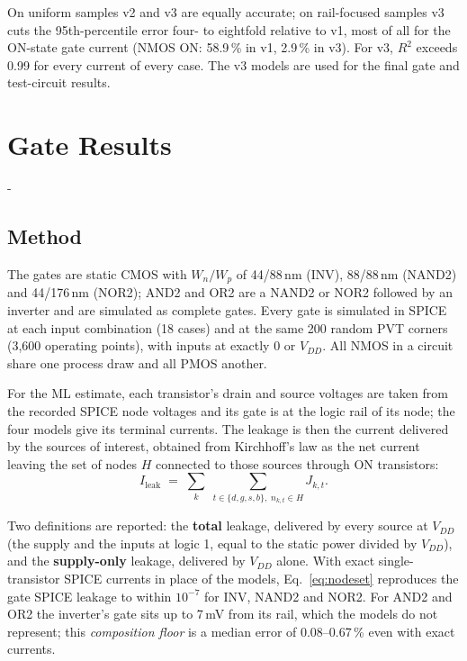 \documentclass[12pt, a4paper]{article}
\makeatletter
\newcommand{\keepspace}[1]{\par\begingroup
  \setlength{\dimen@}{#1}%
  \dimen@ii\pagegoal \advance\dimen@ii-\pagetotal
  \ifdim\dimen@>\dimen@ii
    \ifdim\dimen@ii>\z@ \vfil\fi
    \break
  \fi\endgroup}
\makeatother
\begin{document}
\noindent On uniform samples v2 and v3 are equally accurate; on rail-focused samples v3 cuts the 95th-percentile error four- to eightfold relative to v1, most of all for the ON-state gate current (NMOS ON: 58.9\,\% in v1, 2.9\,\% in v3). For v3, $R^2$ exceeds 0.99 for every current of every case. The v3 models are used for the final gate and test-circuit results.

\newpage
{}
\section{Gate Results}
\label{sec:gates}

\keepspace{14\baselineskip}
\subsection{Method}
\noindent The gates are static CMOS with $W_n/W_p$ of 44/88\,nm (INV), 88/88\,nm (NAND2) and 44/176\,nm (NOR2); AND2 and OR2 are a NAND2 or NOR2 followed by an inverter and are simulated as complete gates. Every gate is simulated in SPICE at each input combination (18 cases) and at the same 200 random PVT corners (3,600 operating points), with inputs at exactly 0 or $V_{DD}$. All NMOS in a circuit share one process draw and all PMOS another.

\medskip
\noindent For the ML estimate, each transistor's drain and source voltages are taken from the recorded SPICE node voltages and its gate is at the logic rail of its node; the four models give its terminal currents. The leakage is then the current delivered by the sources of interest, obtained from Kirchhoff's law as the net current leaving the set of nodes $H$ connected to those sources through ON transistors:
\begin{equation}
    I_{\text{leak}} \;=\; \sum_{k} \;\sum_{t \in \{d,g,s,b\},\; n_{k,t} \in H} J_{k,t}.
    \label{eq:nodeset}
\end{equation}

\noindent Two definitions are reported: the \textbf{total} leakage, delivered by every source at $V_{DD}$ (the supply and the inputs at logic 1, equal to the static power divided by $V_{DD}$), and the \textbf{supply-only} leakage, delivered by $V_{DD}$ alone. With exact single-transistor SPICE currents in place of the models, Eq.~\eqref{eq:nodeset} reproduces the gate SPICE leakage to within $10^{-7}$ for INV, NAND2 and NOR2. For AND2 and OR2 the inverter's gate sits up to 7\,mV from its rail, which the models do not represent; this \emph{composition floor} is a median error of 0.08--0.67\,\% even with exact currents.
\end{document}

